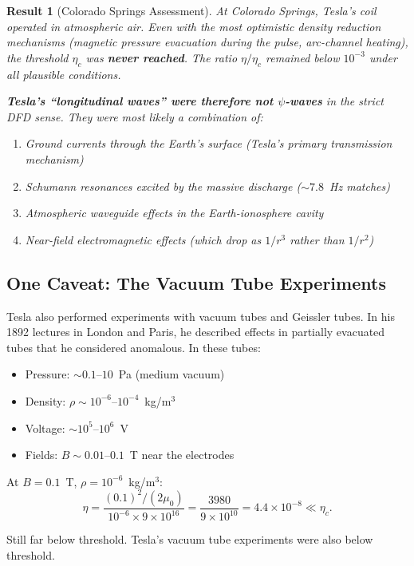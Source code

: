 \documentclass[11pt,a4paper]{article}
\newtheorem{result}{Result}
\begin{document}
\begin{result}[Colorado Springs Assessment]
At Colorado Springs, Tesla's coil operated in atmospheric air. Even with the most
optimistic density reduction mechanisms (magnetic pressure evacuation during the pulse,
arc-channel heating), the threshold $\eta_c$ was \textbf{never reached}. The ratio
$\eta/\eta_c$ remained below $10^{-3}$ under all plausible conditions.

\textbf{Tesla's ``longitudinal waves'' were therefore not $\psi$-waves} in the strict
DFD sense. They were most likely a combination of:
\begin{enumerate}
\item Ground currents through the Earth's surface (Tesla's primary transmission mechanism)
\item Schumann resonances excited by the massive discharge ($\sim 7.8$~Hz matches)
\item Atmospheric waveguide effects in the Earth-ionosphere cavity
\item Near-field electromagnetic effects (which drop as $1/r^3$ rather than $1/r^2$)
\end{enumerate}
\end{result}

\subsection{One Caveat: The Vacuum Tube Experiments}

Tesla also performed experiments with vacuum tubes and Geissler tubes. In his
1892 lectures in London and Paris, he described effects in partially evacuated
tubes that he considered anomalous. In these tubes:
\begin{itemize}
\item Pressure: $\sim 0.1$--$10$~Pa (medium vacuum)
\item Density: $\rho \sim 10^{-6}$--$10^{-4}$~kg/m$^3$
\item Voltage: $\sim 10^5$--$10^6$~V
\item Fields: $B \sim 0.01$--$0.1$~T near the electrodes
\end{itemize}

At $B = 0.1$~T, $\rho = 10^{-6}$~kg/m$^3$:
\begin{equation}
\eta = \frac{(0.1)^2/(2\mu_0)}{10^{-6} \times 9 \times 10^{16}}
= \frac{3980}{9 \times 10^{10}} = 4.4 \times 10^{-8} \ll \eta_c.
\end{equation}

Still far below threshold. Tesla's vacuum tube experiments were also below threshold.
\end{document}
